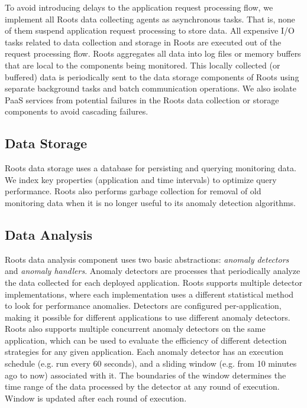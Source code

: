 To avoid introducing delays to the application request processing flow, we implement
all Roots data collecting agents as asynchronous tasks. That is, none of them 
suspend application request processing to store data.
All expensive I/O tasks related to data collection and storage in Roots are
executed out of the request processing flow.
Roots aggregates all data into log files or memory buffers that are local to the components being
monitored. This locally collected (or buffered) data is periodically sent
to the data storage components of Roots using separate background tasks and batch communication
operations. We also isolate PaaS services from potential
failures in the Roots data collection or storage components to avoid cascading failures.

\subsection{Data Storage}

Roots data storage uses a database for persisting and querying monitoring data.
We index key properties (application and time intervals) to optimize query performance.
Roots also performs garbage collection for removal of 
old monitoring data when it is no longer useful 
to its anomaly detection algorithms. 

\subsection{Data Analysis}

Roots data analysis component uses two basic abstractions: \textit{anomaly detectors} 
and \textit{anomaly handlers}.
Anomaly detectors are processes that periodically analyze the data collected for
each deployed application. Roots supports multiple detector implementations, where each implementation
uses a different statistical method to look for performance anomalies. Detectors are configured
per-application, making it possible for different applications to use different anomaly 
detectors. Roots also supports multiple concurrent anomaly detectors on the same application, which can be used
to evaluate the efficiency of different detection strategies for any given application. Each
anomaly detector has an execution schedule (e.g. run every 60 seconds), and a sliding window 
(e.g. from 10 minutes ago to now)
associated with it. The boundaries of the window determines the time range
of the data processed by the detector at any round of execution. Window is updated 
after each round of execution. 

